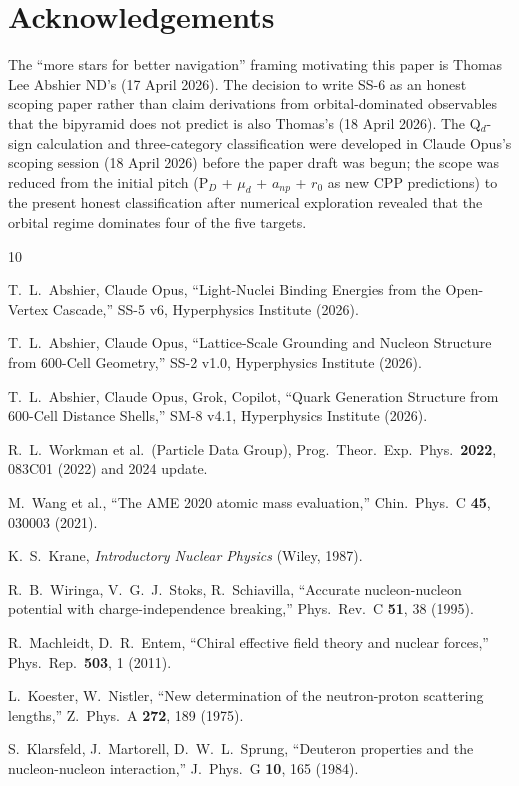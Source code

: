 \documentclass[11pt,letterpaper]{article}
\newcommand{\mud}{\mu_{d}}
\newcommand{\anp}{a_{np}}
\newcommand{\rzero}{r_{0}}
\begin{document}
\section*{Acknowledgements}

The ``more stars for better navigation'' framing motivating this paper is Thomas Lee Abshier ND's (17 April 2026). The decision to write SS-6 as an honest scoping paper rather than claim derivations from orbital-dominated observables that the bipyramid does not predict is also Thomas's (18 April 2026). The Q$_d$-sign calculation and three-category classification were developed in Claude Opus's scoping session (18 April 2026) before the paper draft was begun; the scope was reduced from the initial pitch (P$_D$ + $\mud$ + $\anp$ + $\rzero$ as new CPP predictions) to the present honest classification after numerical exploration revealed that the orbital regime dominates four of the five targets.

\begin{thebibliography}{10}

T.~L.~Abshier, Claude Opus, ``Light-Nuclei Binding Energies from the Open-Vertex Cascade,'' SS-5 v6, Hyperphysics Institute (2026).

T.~L.~Abshier, Claude Opus, ``Lattice-Scale Grounding and Nucleon Structure from 600-Cell Geometry,'' SS-2 v1.0, Hyperphysics Institute (2026).

T.~L.~Abshier, Claude Opus, Grok, Copilot, ``Quark Generation Structure from 600-Cell Distance Shells,'' SM-8 v4.1, Hyperphysics Institute (2026).

R.~L.~Workman et al.\ (Particle Data Group), Prog.\ Theor.\ Exp.\ Phys.\ \textbf{2022}, 083C01 (2022) and 2024 update.

M.~Wang et al., ``The AME 2020 atomic mass evaluation,'' Chin.\ Phys.\ C \textbf{45}, 030003 (2021).

K.~S.~Krane, \emph{Introductory Nuclear Physics} (Wiley, 1987).

R.~B.~Wiringa, V.~G.~J.~Stoks, R.~Schiavilla, ``Accurate nucleon-nucleon potential with charge-independence breaking,'' Phys.\ Rev.\ C \textbf{51}, 38 (1995).

R.~Machleidt, D.~R.~Entem, ``Chiral effective field theory and nuclear forces,'' Phys.\ Rep.\ \textbf{503}, 1 (2011).

L.~Koester, W.~Nistler, ``New determination of the neutron-proton scattering lengths,'' Z.\ Phys.\ A \textbf{272}, 189 (1975).

S.~Klarsfeld, J.~Martorell, D.~W.~L.~Sprung, ``Deuteron properties and the nucleon-nucleon interaction,'' J.\ Phys.\ G \textbf{10}, 165 (1984).

\end{thebibliography}
\end{document}
